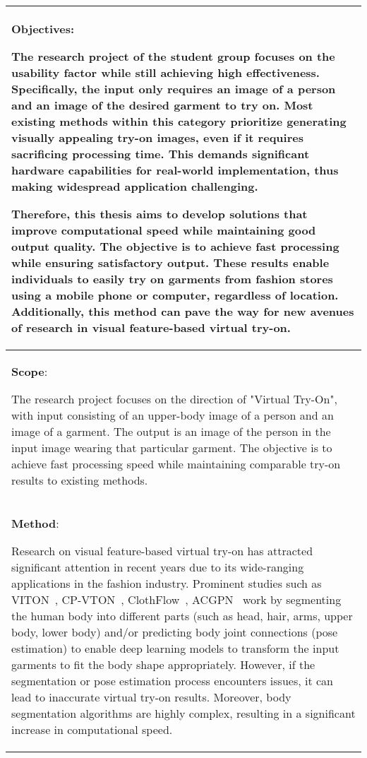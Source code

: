 \begin{longtable}{|p{{{80mm}}}|c|}
\multicolumn{2}{|m{\linewidth}|}{\textbf{Objectives}:\par
The research project of the student group focuses on the usability factor while still achieving high effectiveness. Specifically, the input only requires an image of a person and an image of the desired garment to try on. Most existing methods within this category prioritize generating visually appealing try-on images, even if it requires sacrificing processing time. This demands significant hardware capabilities for real-world implementation, thus making widespread application challenging.\par

Therefore, this thesis aims to develop solutions that improve computational speed while maintaining good output quality. The objective is to achieve fast processing while ensuring satisfactory output. These results enable individuals to easily try on garments from fashion stores using a mobile phone or computer, regardless of location. Additionally, this method can pave the way for new avenues of research in visual feature-based virtual try-on.
}\\
\hline

\multicolumn{2}{|m{\linewidth}|}{\textbf{Scope}:\par
The research project focuses on the direction of "Virtual Try-On", with input consisting of an upper-body image of a person and an image of a garment. The output is an image of the person in the input image wearing that particular garment. The objective is to achieve fast processing speed while maintaining comparable try-on results to existing methods.
}\\
\hline

\multicolumn{2}{|m{\linewidth}|}{\textbf{Method}:\par
Research on visual feature-based virtual try-on has attracted significant attention in recent years due to its wide-ranging applications in the fashion industry. Prominent studies such as VITON~\cite{Han-CVPR2018-Viton}, CP-VTON~\cite{Wang-ECCV2018-Toward}, ClothFlow~\cite{Han-ICCV2019-Clothflow}, ACGPN~\cite{Yang-CVPR2020-Towards} work by segmenting the human body into different parts (such as head, hair, arms, upper body, lower body) and/or predicting body joint connections (pose estimation) to enable deep learning models to transform the input garments to fit the body shape appropriately. However, if the segmentation or pose estimation process encounters issues, it can lead to inaccurate virtual try-on results. Moreover, body segmentation algorithms are highly complex, resulting in a significant increase in computational speed.

}
\end{longtable}
